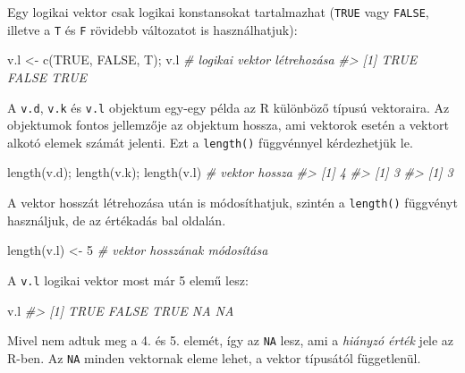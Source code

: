 \documentclass[
]{book}
\newenvironment{Shaded}{\begin{snugshade}}{\end{snugshade}}
\newcommand{\CommentTok}[1]{\textcolor[rgb]{0.56,0.35,0.01}{\textit{#1}}}
\newcommand{\ConstantTok}[1]{\textcolor[rgb]{0.00,0.00,0.00}{#1}}
\newcommand{\DecValTok}[1]{\textcolor[rgb]{0.00,0.00,0.81}{#1}}
\newcommand{\FunctionTok}[1]{\textcolor[rgb]{0.00,0.00,0.00}{#1}}
\newcommand{\NormalTok}[1]{#1}
\newcommand{\OtherTok}[1]{\textcolor[rgb]{0.56,0.35,0.01}{#1}}
\begin{document}
Egy logikai vektor csak logikai konstansokat tartalmazhat (\texttt{TRUE} vagy \texttt{FALSE}, illetve a \texttt{T} és \texttt{F} rövidebb változatot is használhatjuk):

\begin{Shaded}
\begin{Highlighting}[]
\NormalTok{v.l }\OtherTok{\textless{}{-}} \FunctionTok{c}\NormalTok{(}\ConstantTok{TRUE}\NormalTok{, }\ConstantTok{FALSE}\NormalTok{, T); v.l  }\CommentTok{\# logikai vektor létrehozása}
\CommentTok{\#\textgreater{} [1]  TRUE FALSE  TRUE}
\end{Highlighting}
\end{Shaded}

A \texttt{v.d}, \texttt{v.k} és \texttt{v.l} objektum egy-egy példa az R különböző típusú vektoraira. Az objektumok fontos jellemzője az objektum hossza, ami vektorok esetén a vektort alkotó elemek számát jelenti. Ezt a \texttt{length()} függvénnyel kérdezhetjük le.

\begin{Shaded}
\begin{Highlighting}[]
\FunctionTok{length}\NormalTok{(v.d); }\FunctionTok{length}\NormalTok{(v.k); }\FunctionTok{length}\NormalTok{(v.l)  }\CommentTok{\# vektor hossza}
\CommentTok{\#\textgreater{} [1] 4}
\CommentTok{\#\textgreater{} [1] 3}
\CommentTok{\#\textgreater{} [1] 3}
\end{Highlighting}
\end{Shaded}

A vektor hosszát létrehozása után is módosíthatjuk, szintén a \texttt{length()} függvényt használjuk, de az értékadás bal oldalán.

\begin{Shaded}
\begin{Highlighting}[]
\FunctionTok{length}\NormalTok{(v.l) }\OtherTok{\textless{}{-}} \DecValTok{5}  \CommentTok{\# vektor hosszának módosítása}
\end{Highlighting}
\end{Shaded}

A \texttt{v.l} logikai vektor most már 5 elemű lesz:

\begin{Shaded}
\begin{Highlighting}[]
\NormalTok{v.l}
\CommentTok{\#\textgreater{} [1]  TRUE FALSE  TRUE    NA    NA}
\end{Highlighting}
\end{Shaded}

Mivel nem adtuk meg a 4. és 5. elemét, így az \texttt{NA} lesz, ami a \emph{hiányzó érték} jele az R-ben. Az \texttt{NA} minden vektornak eleme lehet, a vektor típusától függetlenül.
\end{document}
